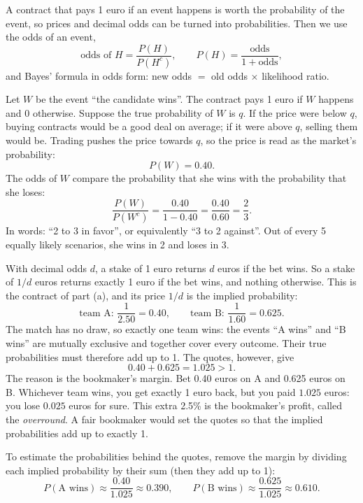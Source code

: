\begin{solution}
	\idea A contract that pays 1 euro if an event happens is worth the
	probability of the event, so prices and decimal odds can be turned into
	probabilities. Then we use the odds of an event,
	\[ \text{odds of } H=\frac{P(H)}{P(H^c)},\qquad
		P(H)=\frac{\text{odds}}{1+\text{odds}}, \]
	and Bayes' formula in odds form: new odds $=$ old odds $\times$ likelihood
	ratio.

	 Let $W$ be the event ``the candidate wins''. The contract pays 1
	euro if $W$ happens and 0 otherwise. Suppose the true probability of $W$ is
	$q$. If the price were below $q$, buying contracts would be a good deal on
	average; if it were above $q$, selling them would be. Trading pushes the
	price towards $q$, so the price is read as the market's probability:
	\[ P(W)=0.40. \]
	The odds of $W$ compare the probability that she wins with the probability
	that she loses:
	\[ \frac{P(W)}{P(W^c)}=\frac{0.40}{1-0.40}=\frac{0.40}{0.60}=\frac23. \]
	In words: ``2 to 3 in favor'', or equivalently ``3 to 2 against''. Out of
	every 5 equally likely scenarios, she wins in 2 and loses in 3.

	 With decimal odds $d$, a stake of 1 euro returns $d$ euros if
	the bet wins. So a stake of $1/d$ euros returns exactly 1 euro if the bet
	wins, and nothing otherwise. This is the contract of part (a), and its
	price $1/d$ is the implied probability:
	\[ \text{team A: } \frac{1}{2.50}=0.40,\qquad
		\text{team B: } \frac{1}{1.60}=0.625. \]
	The match has no draw, so exactly one team wins: the events ``A wins'' and
	``B wins'' are mutually exclusive and together cover every outcome. Their
	true probabilities must therefore add up to 1. The quotes, however, give
	\[ 0.40+0.625=1.025>1. \]
	The reason is the bookmaker's margin. Bet 0.40 euros on A and 0.625 euros
	on B. Whichever team wins, you get exactly 1 euro back, but you paid
	$1.025$ euros: you lose $0.025$ euros for sure. This extra 2.5\% is the
	bookmaker's profit, called the \emph{overround}. A fair bookmaker would set
	the quotes so that the implied probabilities add up to exactly 1.

	To estimate the probabilities behind the quotes, remove the margin by
	dividing each implied probability by their sum (then they add up to 1):
	\[ P(\text{A wins})\approx\frac{0.40}{1.025}\approx 0.390,\qquad
		P(\text{B wins})\approx\frac{0.625}{1.025}\approx 0.610. \]


\end{solution}
